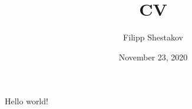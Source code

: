 \documentclass[a4paper, 12pt]{article}
\author{Filipp Shestakov}
\title{CV}
\date{November 23, 2020}
\begin{document}
    \maketitle
    Hello world!
\end{document}
